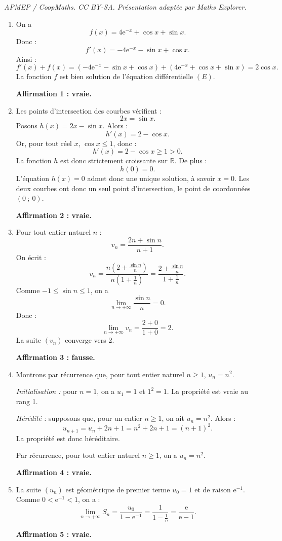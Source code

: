 \documentclass[10pt]{article}
\providecommand{\R}{\mathbb{R}}
\providecommand{\e}{{\mathrm{e}}}
\begin{document}
\noindent\textit{APMEP / CoopMaths. CC BY-SA. Présentation adaptée par Maths Explorer.}\par\medskip
\begin{enumerate}[itemsep=5mm]
	\item On a
	\[
	f(x)=4\e^{-x}+\cos x+\sin x.
	\]
	Donc :
	\[
	f'(x)=-4\e^{-x}-\sin x+\cos x.
	\]
	Ainsi :
	\[
	f'(x)+f(x)=\left(-4\e^{-x}-\sin x+\cos x\right)+\left(4\e^{-x}+\cos x+\sin x\right)=2\cos x.
	\]
	La fonction $f$ est bien solution de l'équation différentielle $(E)$.

	\medskip
	\textbf{Affirmation 1 : vraie.}

	\item Les points d'intersection des courbes vérifient :
	\[
	2x=\sin x.
	\]
	Posons $h(x)=2x-\sin x$.
	Alors :
	\[
	h'(x)=2-\cos x.
	\]
	Or, pour tout réel $x$, $\cos x\leqslant 1$, donc :
	\[
	h'(x)=2-\cos x\geqslant 1>0.
	\]
	La fonction $h$ est donc strictement croissante sur $\R$.
	De plus :
	\[
	h(0)=0.
	\]
	L'équation $h(x)=0$ admet donc une unique solution, à savoir $x=0$.
	Les deux courbes ont donc un seul point d'intersection, le point de coordonnées $(0~;~0)$.

	\medskip
	\textbf{Affirmation 2 : vraie.}

	\item Pour tout entier naturel $n$ :
	\[
	v_n=\dfrac{2n+\sin n}{n+1}.
	\]
	On écrit :
	\[
	v_n=\dfrac{n\left(2+\frac{\sin n}{n}\right)}{n\left(1+\frac{1}{n}\right)}
	=\dfrac{2+\frac{\sin n}{n}}{1+\frac{1}{n}}.
	\]
	Comme $-1\leqslant \sin n\leqslant 1$, on a
	\[
	\lim\limits_{n\to +\infty}\dfrac{\sin n}{n}=0.
	\]
	Donc :
	\[
	\lim\limits_{n\to +\infty} v_n=\dfrac{2+0}{1+0}=2.
	\]
	La suite $(v_n)$ converge vers 2.

	\medskip
	\textbf{Affirmation 3 : fausse.}

	\item Montrons par récurrence que, pour tout entier naturel $n\geqslant 1$, $u_n=n^2$.

	\emph{Initialisation :} pour $n=1$, on a $u_1=1$ et $1^2=1$. La propriété est vraie au rang 1.

	\emph{Hérédité :} supposons que, pour un entier $n\geqslant 1$, on ait $u_n=n^2$.
	Alors :
	\[
	u_{n+1}=u_n+2n+1=n^2+2n+1=(n+1)^2.
	\]
	La propriété est donc héréditaire.

	Par récurrence, pour tout entier naturel $n\geqslant 1$, on a $u_n=n^2$.

	\medskip
	\textbf{Affirmation 4 : vraie.}

	\item La suite $(u_n)$ est géométrique de premier terme $u_0=1$ et de raison $\e^{-1}$.
	Comme $0<\e^{-1}<1$, on a :
	\[
	\lim\limits_{n\to +\infty} S_n=\dfrac{u_0}{1-\e^{-1}}
	=\dfrac{1}{1-\frac{1}{\e}}
	=\dfrac{\e}{\e-1}.
	\]

	\medskip
	\textbf{Affirmation 5 : vraie.}
\end{enumerate}
\end{document}
